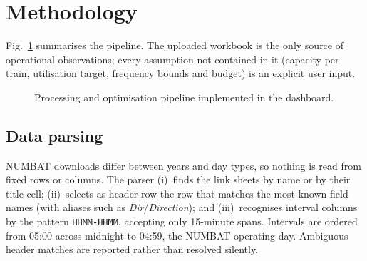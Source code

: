 \documentclass[conference]{IEEEtran}
\begin{document}
\section{Methodology}\label{sec:method}
Fig.~\ref{fig:pipeline} summarises the pipeline. The uploaded workbook is the only source of operational
observations; every assumption not contained in it (capacity per train, utilisation target, frequency bounds and
budget) is an explicit user input.

\begin{figure}[!t]\centering
{}
\caption{Processing and optimisation pipeline implemented in the dashboard.}\label{fig:pipeline}
\end{figure}

\subsection{Data parsing}\label{sec:parse}
NUMBAT downloads differ between years and day types, so nothing is read from fixed rows or columns. The parser
(i)~finds the link sheets by name or by their title cell; (ii)~selects as header row the row that matches the most
known field names (with aliases such as \emph{Dir}/\emph{Direction}); and (iii)~recognises interval columns by the
pattern \texttt{HHMM-HHMM}, accepting only 15-minute spans. Intervals are ordered from 05:00 across midnight
to 04:59, the NUMBAT operating day.
Ambiguous header matches are reported rather than resolved silently.
\end{document}
